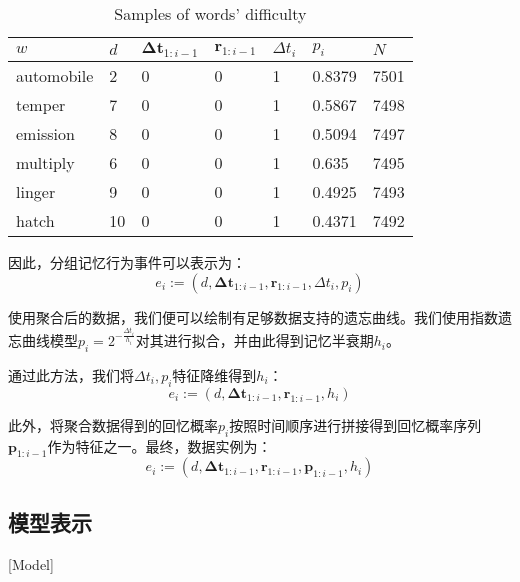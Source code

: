 \begin{table}[htbp]
    \caption{Samples of words' difficulty}
    \label{tab:difficulty}
    \vspace{0.5em}\centering\wuhao
    \begin{tabular}{lllllll}
    \toprule[1.5pt]
    $w$          & $d$  & $\bm{\Delta t}_{1:i-1}$ & $\bm r_{1:i-1}$& $\Delta t_i$ & $p_i$& $N$ \\ 
    \midrule[1pt]
    automobile & 2  & 0          & 0          & 1        & 0.8379    & 7501       \\
    temper     & 7  & 0          & 0          & 1        & 0.5867    & 7498       \\
    emission   & 8  & 0          & 0          & 1        & 0.5094    & 7497       \\
    multiply   & 6  & 0          & 0          & 1        & 0.635     & 7495       \\
    linger     & 9  & 0          & 0          & 1        & 0.4925    & 7493       \\
    hatch      & 10 & 0          & 0          & 1        & 0.4371    & 7492       \\ 
    \bottomrule[1.5pt]
    \end{tabular}
\end{table}

因此，分组记忆行为事件可以表示为：
\begin{equation}
e_{i} :=(d, \bm{\Delta t}_{1:i-1}, \bm r_{1:i-1}, \Delta t_i , p_i)
\end{equation}

使用聚合后的数据，我们便可以绘制有足够数据支持的遗忘曲线。我们使用指数遗忘曲线模型$p_i = 2^{-\frac{\Delta t_i}{h_i}}$对其进行拟合，并由此得到记忆半衰期$h_i$。

通过此方法，我们将$\Delta t_i , p_i$特征降维得到$h_i$：
\begin{equation}
e_{i} :=(d, \bm{\Delta t}_{1:i-1}, \bm r_{1:i-1}, h_i)
\end{equation}

此外，将聚合数据得到的回忆概率$p_i$按照时间顺序进行拼接得到回忆概率序列 $\bm p_{1:i-1}$作为特征之一。最终，数据实例为：
\begin{equation}
e_{i}:=(d, \bm{\Delta t}_{1:i-1}, \bm r_{1:i-1}, \bm p_{1:i-1}, h_i)
\end{equation}

\subsection{模型表示}[Model]\label{sec:LSTM}

